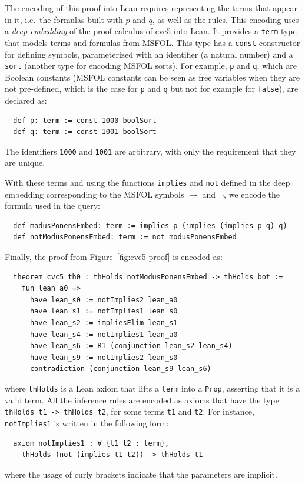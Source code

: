 The encoding of this proof into Lean requires representing the terms that appear
in it, i.e.\ the formulas built with $p$ and $q$, as well as the rules.
%
This encoding uses a \emph{deep embedding} of the proof calculus of cvc5 into
Lean.
%
It provides a \texttt{term} type that models terms and formulas from MSFOL. This type has
a \texttt{const} constructor for defining symbols, parameterized with an
identifier (a natural number) and a \texttt{sort} (another type for encoding MSFOL
sorts).
%
For example, \texttt{p} and \texttt{q}, which are Boolean constants (MSFOL
constants can be seen as free variables when they are not pre-defined, which is
the case for \texttt{p} and \texttt{q} but not for example for \texttt{false}),
are declared as:

\begin{verbatim}
  def p: term := const 1000 boolSort
  def q: term := const 1001 boolSort
\end{verbatim}

The identifiers \texttt{1000} and \texttt{1001} are arbitrary, with only the
requirement that they are unique.

With these terms and using the functions \texttt{implies} and
\texttt{not} defined in the deep embedding corresponding to the MSFOL symbols
$\rightarrow$ and $\neg$, we encode the formula used in the
query:

\begin{verbatim}
  def modusPonensEmbed: term := implies p (implies (implies p q) q)
  def notModusPonensEmbed: term := not modusPonensEmbed
\end{verbatim}

Finally, the proof from Figure~\ref{fig:cvc5-proof} is encoded as:

\begin{verbatim}
  theorem cvc5_th0 : thHolds notModusPonensEmbed -> thHolds bot :=
    fun lean_a0 =>
      have lean_s0 := notImplies2 lean_a0
      have lean_s1 := notImplies1 lean_s0
      have lean_s2 := impliesElim lean_s1
      have lean_s4 := notImplies1 lean_a0
      have lean_s6 := R1 (conjunction lean_s2 lean_s4)
      have lean_s9 := notImplies2 lean_s0
      contradiction (conjunction lean_s9 lean_s6)
\end{verbatim}
where \texttt{thHolds} is a Lean axiom that lifts a \texttt{term} into a \texttt{Prop}, asserting that it is a valid term.
All the inference rules are encoded as axioms that have the type \texttt{thHolds t1 -> thHolds t2}, for some terms \texttt{t1} and \texttt{t2}. For instance, \texttt{notImplies1} is written in the following form:
\begin{verbatim}
  axiom notImplies1 : ∀ {t1 t2 : term},
    thHolds (not (implies t1 t2)) -> thHolds t1
\end{verbatim}
where the usage of curly brackets indicate that the parameters are implicit.

